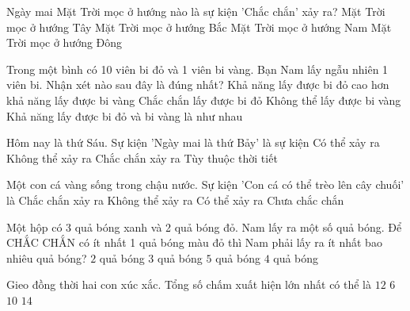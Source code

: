\begin{ex} %
Ngày mai Mặt Trời mọc ở hướng nào là sự kiện 'Chắc chắn' xảy ra?
\choice
{Mặt Trời mọc ở hướng Tây}
{Mặt Trời mọc ở hướng Bắc}
{Mặt Trời mọc ở hướng Nam}
{\True Mặt Trời mọc ở hướng Đông}
\end{ex}

\begin{ex} %
Trong một bình có 10 viên bi đỏ và 1 viên bi vàng. Bạn Nam lấy ngẫu nhiên 1 viên bi. Nhận xét nào sau đây là đúng nhất?
\choice
{\True Khả năng lấy được bi đỏ cao hơn khả năng lấy được bi vàng}
{Chắc chắn lấy được bi đỏ}
{Không thể lấy được bi vàng}
{Khả năng lấy được bi đỏ và bi vàng là như nhau}
\end{ex}

\begin{ex} %
Hôm nay là thứ Sáu. Sự kiện 'Ngày mai là thứ Bảy' là sự kiện
\choice
{Có thể xảy ra}
{Không thể xảy ra}
{\True Chắc chắn xảy ra}
{Tùy thuộc thời tiết}
\end{ex}

\begin{ex} %
Một con cá vàng sống trong chậu nước. Sự kiện 'Con cá có thể trèo lên cây chuối' là
\choice
{Chắc chắn xảy ra}
{\True Không thể xảy ra}
{Có thể xảy ra}
{Chưa chắc chắn}
\end{ex}

\begin{ex} %
Một hộp có 3 quả bóng xanh và 2 quả bóng đỏ. Nam lấy ra một số quả bóng. Để CHẮC CHẮN có ít nhất 1 quả bóng màu đỏ thì Nam phải lấy ra ít nhất bao nhiêu quả bóng?
\choice
{$2$ quả bóng}
{$3$ quả bóng}
{$5$ quả bóng}
{\True $4$ quả bóng}
\end{ex}

\begin{ex} %
Gieo đồng thời hai con xúc xắc. Tổng số chấm xuất hiện lớn nhất có thể là
\choice
{\True $12$}
{$6$}
{$10$}
{$14$}
\end{ex}

